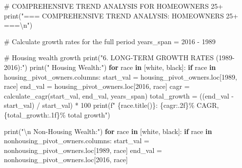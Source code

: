 \documentclass[
  letterpaper,
  DIV=11,
  numbers=noendperiod]{scrartcl}
\newenvironment{Shaded}{\begin{snugshade}}{\end{snugshade}}
\newcommand{\BuiltInTok}[1]{\textcolor[rgb]{0.00,0.23,0.31}{#1}}
\newcommand{\CharTok}[1]{\textcolor[rgb]{0.13,0.47,0.30}{#1}}
\newcommand{\CommentTok}[1]{\textcolor[rgb]{0.37,0.37,0.37}{#1}}
\newcommand{\ControlFlowTok}[1]{\textcolor[rgb]{0.00,0.23,0.31}{\textbf{#1}}}
\newcommand{\DecValTok}[1]{\textcolor[rgb]{0.68,0.00,0.00}{#1}}
\newcommand{\KeywordTok}[1]{\textcolor[rgb]{0.00,0.23,0.31}{\textbf{#1}}}
\newcommand{\NormalTok}[1]{\textcolor[rgb]{0.00,0.23,0.31}{#1}}
\newcommand{\OperatorTok}[1]{\textcolor[rgb]{0.37,0.37,0.37}{#1}}
\newcommand{\SpecialCharTok}[1]{\textcolor[rgb]{0.37,0.37,0.37}{#1}}
\newcommand{\SpecialStringTok}[1]{\textcolor[rgb]{0.13,0.47,0.30}{#1}}
\newcommand{\StringTok}[1]{\textcolor[rgb]{0.13,0.47,0.30}{#1}}
\begin{document}
\begin{Shaded}
\begin{Highlighting}[]
\CommentTok{\# COMPREHENSIVE TREND ANALYSIS FOR HOMEOWNERS 25+}
\BuiltInTok{print}\NormalTok{(}\StringTok{"=== COMPREHENSIVE TREND ANALYSIS: HOMEOWNERS 25+ ===}\CharTok{\textbackslash{}n}\StringTok{"}\NormalTok{)}

\CommentTok{\# Calculate growth rates for the full period}
\NormalTok{years\_span }\OperatorTok{=} \DecValTok{2016} \OperatorTok{{-}} \DecValTok{1989}

\CommentTok{\# Housing wealth growth}
\BuiltInTok{print}\NormalTok{(}\StringTok{"6. LONG{-}TERM GROWTH RATES (1989{-}2016):"}\NormalTok{)}
\BuiltInTok{print}\NormalTok{(}\StringTok{"   Housing Wealth:"}\NormalTok{)}
\ControlFlowTok{for}\NormalTok{ race }\KeywordTok{in}\NormalTok{ [}\StringTok{\textquotesingle{}white\textquotesingle{}}\NormalTok{, }\StringTok{\textquotesingle{}black\textquotesingle{}}\NormalTok{]:}
    \ControlFlowTok{if}\NormalTok{ race }\KeywordTok{in}\NormalTok{ housing\_pivot\_owners.columns:}
\NormalTok{        start\_val }\OperatorTok{=}\NormalTok{ housing\_pivot\_owners.loc[}\DecValTok{1989}\NormalTok{, race]}
\NormalTok{        end\_val }\OperatorTok{=}\NormalTok{ housing\_pivot\_owners.loc[}\DecValTok{2016}\NormalTok{, race]}
\NormalTok{        cagr }\OperatorTok{=}\NormalTok{ calculate\_cagr(start\_val, end\_val, years\_span)}
\NormalTok{        total\_growth }\OperatorTok{=}\NormalTok{ ((end\_val }\OperatorTok{{-}}\NormalTok{ start\_val) }\OperatorTok{/}\NormalTok{ start\_val) }\OperatorTok{*} \DecValTok{100}
        \BuiltInTok{print}\NormalTok{(}\SpecialStringTok{f"     }\SpecialCharTok{\{}\NormalTok{race}\SpecialCharTok{.}\NormalTok{title()}\SpecialCharTok{\}}\SpecialStringTok{: }\SpecialCharTok{\{}\NormalTok{cagr}\SpecialCharTok{:.2f\}}\SpecialStringTok{\% CAGR, }\SpecialCharTok{\{}\NormalTok{total\_growth}\SpecialCharTok{:.1f\}}\SpecialStringTok{\% total growth"}\NormalTok{)}

\BuiltInTok{print}\NormalTok{(}\StringTok{"}\CharTok{\textbackslash{}n}\StringTok{   Non{-}Housing Wealth:"}\NormalTok{)}
\ControlFlowTok{for}\NormalTok{ race }\KeywordTok{in}\NormalTok{ [}\StringTok{\textquotesingle{}white\textquotesingle{}}\NormalTok{, }\StringTok{\textquotesingle{}black\textquotesingle{}}\NormalTok{]:}
    \ControlFlowTok{if}\NormalTok{ race }\KeywordTok{in}\NormalTok{ nonhousing\_pivot\_owners.columns:}
\NormalTok{        start\_val }\OperatorTok{=}\NormalTok{ nonhousing\_pivot\_owners.loc[}\DecValTok{1989}\NormalTok{, race]}
\NormalTok{        end\_val }\OperatorTok{=}\NormalTok{ nonhousing\_pivot\_owners.loc[}\DecValTok{2016}\NormalTok{, race]}
        

\end{Highlighting}
\end{Shaded}
\end{document}
